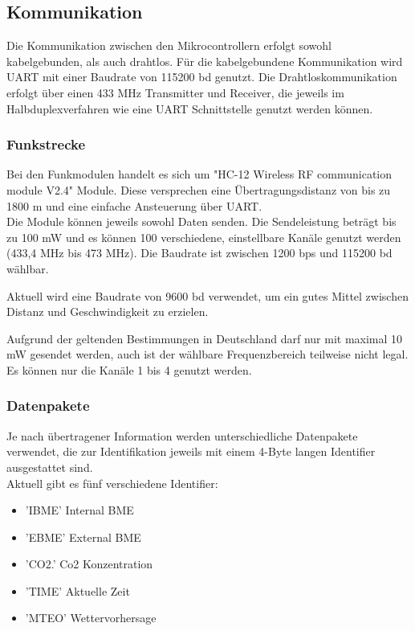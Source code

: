 \documentclass[a4paper,11pt]{article}
\begin{document}
\newpage
\subsection{Kommunikation}
\label{subsub:kommunikation}

Die Kommunikation zwischen den Mikrocontrollern erfolgt sowohl kabelgebunden, als auch drahtlos. Für die kabelgebundene Kommunikation wird UART mit einer Baudrate
von 115200 bd genutzt. Die Drahtloskommunikation erfolgt über einen 433 MHz Transmitter und Receiver, die jeweils im Halbduplexverfahren wie eine UART Schnittstelle
genutzt werden können. 

\subsubsection{Funkstrecke}
\label{subsubsub:funkstrecke}

Bei den Funkmodulen handelt es sich um "HC-12 Wireless RF communication module V2.4" Module. Diese versprechen eine Übertragungsdistanz von bis zu 1800 m
und eine einfache Ansteuerung über UART. \\
Die Module können jeweils sowohl Daten senden. 
Die Sendeleistung beträgt bis zu 100 mW und es können 100 verschiedene, einstellbare Kanäle genutzt werden (433,4 MHz bis 473 MHz). Die Baudrate ist zwischen 
1200 bps und 115200 bd wählbar. 

\vspace{0.2cm}
\noindent
Aktuell wird eine Baudrate von 9600 bd verwendet, um ein gutes Mittel zwischen Distanz und Geschwindigkeit zu erzielen. 

\vspace{0.5cm}
\noindent
Aufgrund der geltenden Bestimmungen in Deutschland darf nur mit maximal 10 mW gesendet werden, auch ist der wählbare Frequenzbereich teilweise nicht legal.
Es können nur die Kanäle 1 bis 4 genutzt werden. 

\subsubsection{Datenpakete}
\label{subsubsub:datenpakete}

Je nach übertragener Information werden unterschiedliche Datenpakete verwendet, die zur Identifikation jeweils mit einem 4-Byte langen Identifier ausgestattet sind. \\
Aktuell gibt es fünf verschiedene Identifier:
\begin{itemize}
  \item 'IBME' Internal BME
  \item 'EBME' External BME
  \item 'CO2.' Co2 Konzentration
  \item 'TIME' Aktuelle Zeit
  \item 'MTEO' Wettervorhersage
\end{itemize}
\end{document}
